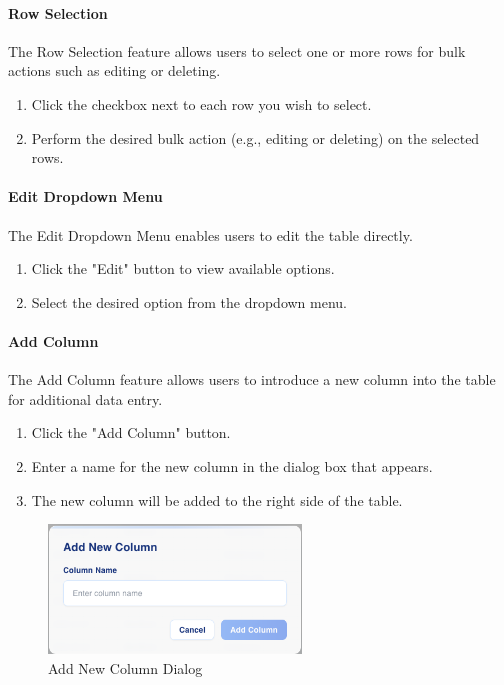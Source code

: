 \documentclass[12pt]{article}
\begin{document}
\paragraph{Row Selection}
The Row Selection feature allows users to select one or more rows for bulk
actions such as editing or deleting.
\begin{enumerate}
    \item Click the checkbox next to each row you wish to select.
    \item Perform the desired bulk action (e.g., editing or deleting) on the
    selected rows.
\end{enumerate}

\paragraph{Edit Dropdown Menu}
The Edit Dropdown Menu enables users to edit the table directly.
\begin{enumerate}
    \item Click the "Edit" button to view available options.
    \item Select the desired option from the dropdown menu.
\end{enumerate}

\paragraph{Add Column}
The Add Column feature allows users to introduce a new column into the table for
additional data entry.
\begin{enumerate}
    \item Click the "Add Column" button.
    \item Enter a name for the new column in the dialog box that appears.
    \item The new column will be added to the right side of the table.
\end{enumerate}

\begin{figure}[H]
    \centering
    \includegraphics[width=0.6\textwidth]{./Diagrams/AddColumn.png}
    \caption{Add New Column Dialog}
\end{figure}
\end{document}
